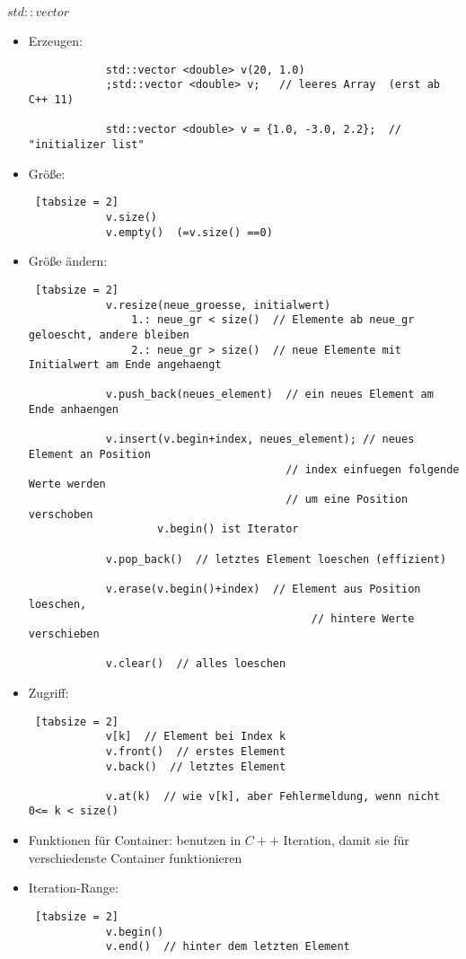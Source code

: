 \documentclass{article}
\begin{document}
	 \paragraph{$std::vector$}
	 \begin{itemize}
	 	\item Erzeugen:
	 	\begin{lstlisting}
	 		std::vector <double> v(20, 1.0)
	 		;std::vector <double> v;   // leeres Array  (erst ab C++ 11)
	 		
	 		std::vector <double> v = {1.0, -3.0, 2.2};  // "initializer list"
	 	\end{lstlisting}
	 	\item Größe:
	 	\begin{lstlisting} [tabsize = 2]
	 		v.size()
	 		v.empty()  (=v.size() ==0)
	 	\end{lstlisting}
	 	\item Größe ändern:
	 	\begin{lstlisting} [tabsize = 2]
	 		v.resize(neue_groesse, initialwert)
			 	1.: neue_gr < size()  // Elemente ab neue_gr geloescht, andere bleiben
			 	2.: neue_gr > size()  // neue Elemente mit Initialwert am Ende angehaengt
			 	
	 		v.push_back(neues_element)  // ein neues Element am Ende anhaengen
	 		
	 		v.insert(v.begin+index, neues_element); // neues Element an Position
								 		// index einfuegen folgende Werte werden 
								 		// um eine Position verschoben
				 	v.begin() ist Iterator
		 	
		 	v.pop_back()  // letztes Element loeschen (effizient)
		 	
		 	v.erase(v.begin()+index)  // Element aus Position loeschen, 
										 	// hintere Werte verschieben
		 	
		 	v.clear()  // alles loeschen
	 	\end{lstlisting}
	 	\item Zugriff:
	 	\begin{lstlisting} [tabsize = 2]
	 		v[k]  // Element bei Index k
	 		v.front()  // erstes Element
	 		v.back()  // letztes Element
	 		
	 		v.at(k)  // wie v[k], aber Fehlermeldung, wenn nicht 0<= k < size()
	 	\end{lstlisting}
	 	\item Funktionen für Container: benutzen in $C++$ Iteration, damit sie für verschiedenste Container funktionieren
	 	\item Iteration-Range: 
	 	\begin{lstlisting} [tabsize = 2]
	 		v.begin()
	 		v.end()  // hinter dem letzten Element
	 		

\end{lstlisting}
\end{itemize}
\end{document}
